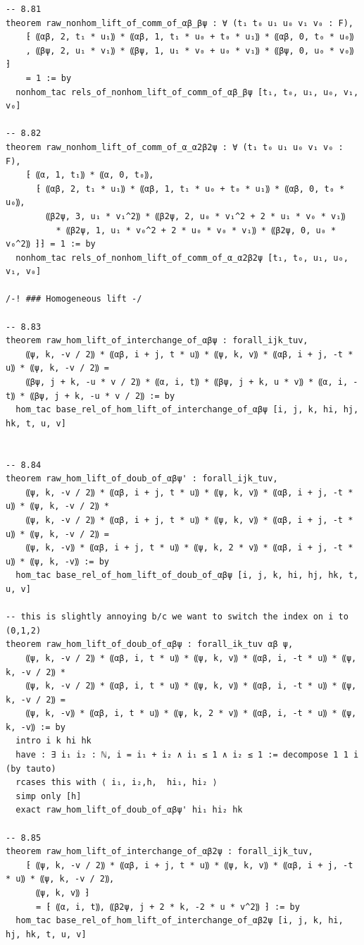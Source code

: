 \documentclass[10pt,a4paper]{article}
\begin{document}
\begin{Verbatim}
-- 8.81
theorem raw_nonhom_lift_of_comm_of_αβ_βψ : ∀ (t₁ t₀ u₁ u₀ v₁ v₀ : F),
    ⁅ ⸨αβ, 2, t₁ * u₁⸩ * ⸨αβ, 1, t₁ * u₀ + t₀ * u₁⸩ * ⸨αβ, 0, t₀ * u₀⸩
    , ⸨βψ, 2, u₁ * v₁⸩ * ⸨βψ, 1, u₁ * v₀ + u₀ * v₁⸩ * ⸨βψ, 0, u₀ * v₀⸩ ⁆
    = 1 := by
  nonhom_tac rels_of_nonhom_lift_of_comm_of_αβ_βψ [t₁, t₀, u₁, u₀, v₁, v₀]

-- 8.82
theorem raw_nonhom_lift_of_comm_of_α_α2β2ψ : ∀ (t₁ t₀ u₁ u₀ v₁ v₀ : F),
    ⁅ ⸨α, 1, t₁⸩ * ⸨α, 0, t₀⸩,
      ⁅ ⸨αβ, 2, t₁ * u₁⸩ * ⸨αβ, 1, t₁ * u₀ + t₀ * u₁⸩ * ⸨αβ, 0, t₀ * u₀⸩,
        ⸨β2ψ, 3, u₁ * v₁^2⸩ * ⸨β2ψ, 2, u₀ * v₁^2 + 2 * u₁ * v₀ * v₁⸩
          * ⸨β2ψ, 1, u₁ * v₀^2 + 2 * u₀ * v₀ * v₁⸩ * ⸨β2ψ, 0, u₀ * v₀^2⸩ ⁆⁆ = 1 := by
  nonhom_tac rels_of_nonhom_lift_of_comm_of_α_α2β2ψ [t₁, t₀, u₁, u₀, v₁, v₀]

/-! ### Homogeneous lift -/

-- 8.83
theorem raw_hom_lift_of_interchange_of_αβψ : forall_ijk_tuv,
    ⸨ψ, k, -v / 2⸩ * ⸨αβ, i + j, t * u⸩ * ⸨ψ, k, v⸩ * ⸨αβ, i + j, -t * u⸩ * ⸨ψ, k, -v / 2⸩ =
    ⸨βψ, j + k, -u * v / 2⸩ * ⸨α, i, t⸩ * ⸨βψ, j + k, u * v⸩ * ⸨α, i, -t⸩ * ⸨βψ, j + k, -u * v / 2⸩ := by
  hom_tac base_rel_of_hom_lift_of_interchange_of_αβψ [i, j, k, hi, hj, hk, t, u, v]


-- 8.84
theorem raw_hom_lift_of_doub_of_αβψ' : forall_ijk_tuv,
    ⸨ψ, k, -v / 2⸩ * ⸨αβ, i + j, t * u⸩ * ⸨ψ, k, v⸩ * ⸨αβ, i + j, -t * u⸩ * ⸨ψ, k, -v / 2⸩ *
    ⸨ψ, k, -v / 2⸩ * ⸨αβ, i + j, t * u⸩ * ⸨ψ, k, v⸩ * ⸨αβ, i + j, -t * u⸩ * ⸨ψ, k, -v / 2⸩ =
    ⸨ψ, k, -v⸩ * ⸨αβ, i + j, t * u⸩ * ⸨ψ, k, 2 * v⸩ * ⸨αβ, i + j, -t * u⸩ * ⸨ψ, k, -v⸩ := by
  hom_tac base_rel_of_hom_lift_of_doub_of_αβψ [i, j, k, hi, hj, hk, t, u, v]

-- this is slightly annoying b/c we want to switch the index on i to (0,1,2)
theorem raw_hom_lift_of_doub_of_αβψ : forall_ik_tuv αβ ψ,
    ⸨ψ, k, -v / 2⸩ * ⸨αβ, i, t * u⸩ * ⸨ψ, k, v⸩ * ⸨αβ, i, -t * u⸩ * ⸨ψ, k, -v / 2⸩ *
    ⸨ψ, k, -v / 2⸩ * ⸨αβ, i, t * u⸩ * ⸨ψ, k, v⸩ * ⸨αβ, i, -t * u⸩ * ⸨ψ, k, -v / 2⸩ =
    ⸨ψ, k, -v⸩ * ⸨αβ, i, t * u⸩ * ⸨ψ, k, 2 * v⸩ * ⸨αβ, i, -t * u⸩ * ⸨ψ, k, -v⸩ := by
  intro i k hi hk
  have : ∃ i₁ i₂ : ℕ, i = i₁ + i₂ ∧ i₁ ≤ 1 ∧ i₂ ≤ 1 := decompose 1 1 i (by tauto)
  rcases this with ⟨ i₁, i₂,h,  hi₁, hi₂ ⟩
  simp only [h]
  exact raw_hom_lift_of_doub_of_αβψ' hi₁ hi₂ hk

-- 8.85
theorem raw_hom_lift_of_interchange_of_αβ2ψ : forall_ijk_tuv,
    ⁅ ⸨ψ, k, -v / 2⸩ * ⸨αβ, i + j, t * u⸩ * ⸨ψ, k, v⸩ * ⸨αβ, i + j, -t * u⸩ * ⸨ψ, k, -v / 2⸩,
      ⸨ψ, k, v⸩ ⁆
      = ⁅ ⸨α, i, t⸩, ⸨β2ψ, j + 2 * k, -2 * u * v^2⸩ ⁆ := by
  hom_tac base_rel_of_hom_lift_of_interchange_of_αβ2ψ [i, j, k, hi, hj, hk, t, u, v]


\end{Verbatim}
\end{document}
